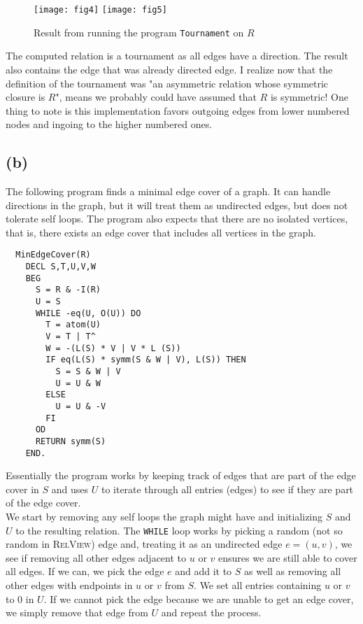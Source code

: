 \documentclass[a4paper, fleqn]{article}
\begin{document}
\begin{figure}[H]
  \centering
  \texttt{[image: fig4]}
  \texttt{[image: fig5]}
  \caption{Result from running the program \texttt{Tournament} on $R$}
\end{figure}
The computed relation is a tournament as all edges have a direction. The result also
contains the edge that was already directed edge. I realize
now that the definition of the tournament was "an asymmetric relation whose symmetric
closure is $R$", means we probably could have assumed that $R$ is symmetric! One thing to
note is this implementation favors outgoing edges from lower numbered nodes and ingoing
to the higher numbered ones.

\subsection{(b)}
The following program finds a minimal edge cover of a graph. It can handle directions in
the graph, but it will treat them as undirected edges, but does not tolerate self loops.
The program also expects that there are no isolated vertices, that is, there exists an
edge cover that includes all vertices in the graph.
\begin{verbatim}
  MinEdgeCover(R)
    DECL S,T,U,V,W
    BEG
      S = R & -I(R)
      U = S
      WHILE -eq(U, O(U)) DO
        T = atom(U)
        V = T | T^
        W = -(L(S) * V | V * L (S))
        IF eq(L(S) * symm(S & W | V), L(S)) THEN
          S = S & W | V
          U = U & W
        ELSE
          U = U & -V
        FI
      OD
      RETURN symm(S)
    END.
\end{verbatim}
Essentially the program works by keeping track of edges that are part of the edge cover
in $S$ and uses $U$ to iterate through all entries (edges) to see if they are part of the
edge cover. \\
We start by removing any self loops the graph might have and initializing $S$ and $U$ to
the resulting relation. The \texttt{WHILE} loop works by picking a random (not so random
in \textsc{RelView}) edge and, treating it as an undirected edge $e=(u,v)$, we see if
removing all other edges adjacent to $u$ or $v$ ensures we are still able to cover
all edges. If we can, we pick the edge $e$ and add it to $S$ as well as removing all other
edges with endpoints in $u$ or $v$ from $S$. We set all entries containing $u$ or $v$ to
$0$ in $U$. If we cannot pick the edge because we are unable to get an edge cover, we
simply remove that edge from $U$ and repeat the process. \\
\end{document}
